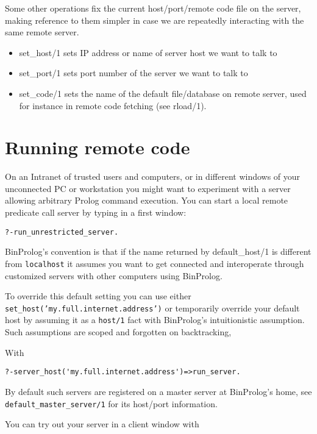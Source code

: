 \documentclass{article}
\begin{document}
Some other operations fix the current host/port/remote code file
on the server, making reference to them simpler in case
we are repeatedly interacting with the same remote server.

\begin{itemize}
\item set\_host/1 sets IP address or name of server host we want to talk to
\item set\_port/1 sets port number of the server we want to talk to
\item set\_code/1 sets the name of the default file/database on remote server, used for instance in remote code fetching (see rload/1).

\end{itemize}

\section{Running remote code}

On an Intranet of trusted users and computers, or in different
windows of your unconnected PC or workstation you might want 
to experiment with a server allowing arbitrary Prolog command
execution. You can start a local remote predicate call server
by typing in a first window:

\begin{verbatim}
?-run_unrestricted_server.
\end{verbatim}

BinProlog's convention is that if the name returned by default\_host/1
is different from {\tt localhost} it assumes you want to get connected
and interoperate through customized servers with other computers using BinProlog.

To override this default setting you can use either
{\tt set\_host('my.full.internet.address')} or
temporarily override your default host by assuming it as a {\tt host/1}
fact with
BinProlog's intuitionistic assumption. Such assumptions are scoped and
forgotten on backtracking,

With

\begin{verbatim}
?-server_host('my.full.internet.address')=>run_server.
\end{verbatim}

By default such servers are registered
on a master server at BinProlog's home,
see {\tt default\_master\_server/1} for its
host/port information.

You can try out your server in a client window with
\end{document}
